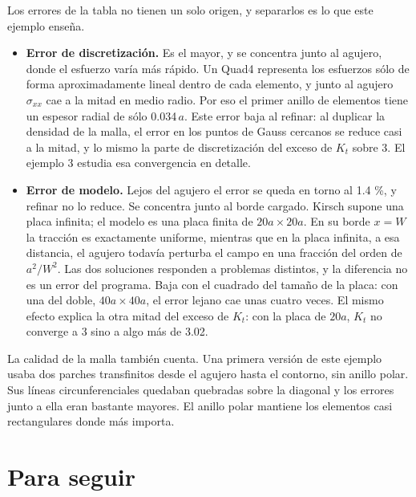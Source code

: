 \documentclass[11pt,oneside]{report}
\begin{document}
Los errores de la tabla no tienen un solo origen, y separarlos es lo que este ejemplo enseña.

\begin{itemize}
  \item \textbf{Error de discretización.} Es el mayor, y se concentra junto al agujero, donde el esfuerzo varía más rápido. Un Quad4 representa los esfuerzos sólo de forma aproximadamente lineal dentro de cada elemento, y junto al agujero $\sigma_{xx}$ cae a la mitad en medio radio. Por eso el primer anillo de elementos tiene un espesor radial de sólo 0.034$\,a$. Este error baja al refinar: al duplicar la densidad de la malla, el error en los puntos de Gauss cercanos se reduce casi a la mitad, y lo mismo la parte de discretización del exceso de $K_t$ sobre 3. El ejemplo 3 estudia esa convergencia en detalle.
  \item \textbf{Error de modelo.} Lejos del agujero el error se queda en torno al 1.4 \%, y refinar no lo reduce. Se concentra junto al borde cargado. Kirsch supone una placa infinita; el modelo es una placa finita de $20a \times 20a$. En su borde $x = W$ la tracción es exactamente uniforme, mientras que en la placa infinita, a esa distancia, el agujero todavía perturba el campo en una fracción del orden de $a^2/W^2$. Las dos soluciones responden a problemas distintos, y la diferencia no es un error del programa. Baja con el cuadrado del tamaño de la placa: con una del doble, $40a \times 40a$, el error lejano cae unas cuatro veces. El mismo efecto explica la otra mitad del exceso de $K_t$: con la placa de $20a$, $K_t$ no converge a 3 sino a algo más de 3.02.
\end{itemize}

La calidad de la malla también cuenta. Una primera versión de este ejemplo usaba dos parches transfinitos desde el agujero hasta el contorno, sin anillo polar. Sus líneas circunferenciales quedaban quebradas sobre la diagonal y los errores junto a ella eran bastante mayores. El anillo polar mantiene los elementos casi rectangulares donde más importa.

\section{Para seguir}
\end{document}
